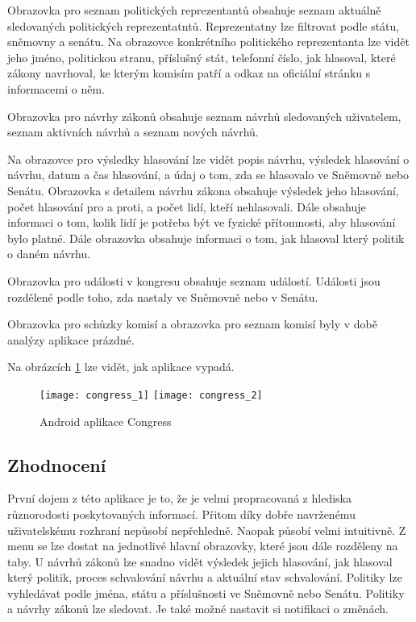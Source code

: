 Obrazovka pro seznam politických reprezentantů obsahuje seznam aktuálně sledovaných politických reprezentatntů. Reprezentatny lze filtrovat podle státu, sněmovny a senátu. Na obrazovce konkrétního politického reprezentanta lze vidět jeho jméno, politickou stranu, příslušný stát, telefonní číslo, jak hlasoval, které zákony navrhoval, ke kterým komisím patří a odkaz na oficiální stránku s informacemi o něm. 

Obrazovka pro návrhy zákonů obsahuje seznam návrhů sledovaných uživatelem, seznam aktivních návrhů a seznam nových návrhů.

Na obrazovce pro výsledky hlasování lze vidět popis návrhu, výsledek hlasování \linebreak o návrhu, datum a čas hlasování, a údaj o tom, zda se hlasovalo ve Sněmovně nebo Senátu. Obrazovka s detailem návrhu zákona obsahuje výsledek jeho hlasování, počet hlasování \linebreak pro a proti, a počet lidí, kteří nehlasovali. Dále obsahuje informaci o tom, kolik lidí je potřeba být ve fyzické přítomnosti, aby hlasování bylo platné. Dále obrazovka obsahuje informaci \linebreak o tom, jak hlasoval který politik o daném návrhu.

Obrazovka pro události v kongresu obsahuje seznam událostí. Události jsou rozdělené podle toho, zda nastaly ve Sněmovně nebo v Senátu. 

Obrazovka pro schůzky komisí a obrazovka pro seznam komisí byly v době analýzy aplikace prázdné.

Na obrázcích \ref{fig:congress} lze vidět, jak aplikace vypadá.
 
\begin{figure}
	\centering
	
	\texttt{[image: congress\_1]}
	\texttt{[image: congress\_2]}
	
	\caption{Android aplikace Congress \cite{congress}}
	\label{fig:congress}
\end{figure}

\subsection{Zhodnocení}
První dojem z této aplikace je to, že je velmi propracovaná z hlediska různorodosti poskytovaných informací. Přitom díky dobře navrženému uživatelskému rozhraní nepůsobí nepřehledně. Naopak působí velmi intuitivně. Z menu se lze dostat na jednotlivé hlavní obrazovky, které jsou dále rozděleny na taby. U návrhů zákonů lze snadno vidět výsledek jejich hlasování, jak hlasoval který \linebreak politik, proces schvalování návrhu a aktuální stav schvalování. Politiky lze vyhledávat podle jména, státu a příslušnosti ve Sněmovně nebo Senátu. Politiky a návrhy zákonů lze sledovat. Je také možné nastavit si notifikaci o změnách.

